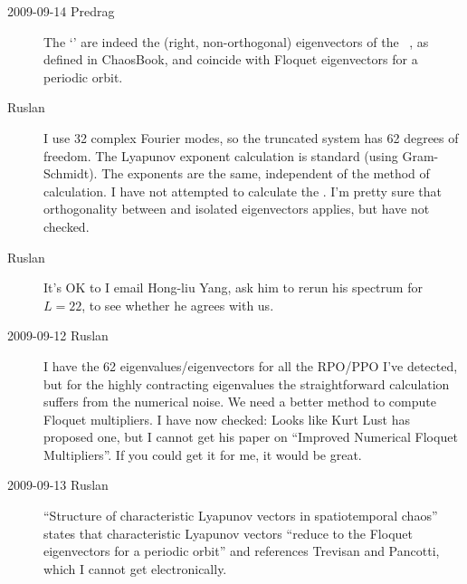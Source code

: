 \begin{description}
\item[2009-09-14 Predrag]
  The `{\cLvs}' are indeed the (right,
  non-orthogonal) eigenvectors of the \jacobianM\ \jMps, as
  defined in ChaosBook, and coincide with Floquet eigenvectors
  for a periodic orbit.

\item[Ruslan] I use 32 complex Fourier modes, so the
  truncated system has 62 degrees of freedom.  The Lyapunov
  exponent calculation is standard (using Gram-Schmidt).  The
  exponents are the same, independent of the method of
  calculation.  I have not attempted to calculate the {\cLvs}. I'm pretty sure that
  orthogonality between {\entangled} and isolated eigenvectors
  applies, but have not checked.

\item[Ruslan]
  It's OK to I email Hong-liu Yang, ask him to rerun his
  {\cLv} spectrum for $L=22$, to see whether he agrees with us.

\item[2009-09-12 Ruslan]
  I have the 62 eigenvalues/eigenvectors for all the RPO/PPO
  I've detected, but for the highly contracting eigenvalues
  the straightforward calculation
  suffers from the numerical noise. We need a
  better method to compute Floquet multipliers. I have now
  checked:   Looks like {Kurt Lust} has proposed one, but I
  cannot get his paper on ``Improved Numerical Floquet
  Multipliers''. If you could
  get it for me, it would be great.
  \label{2013-11-18XD}

\item[2009-09-13 Ruslan]
  ``Structure of characteristic Lyapunov
  vectors in spatiotemporal chaos'' states
  that characteristic Lyapunov vectors ``reduce to the Floquet
  eigenvectors for a periodic orbit'' and references Trevisan
  and Pancotti, which I cannot get electronically.


\end{description}
